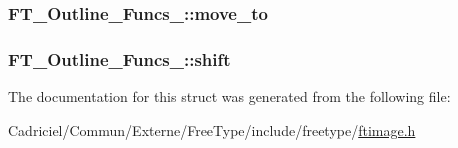 \hypertarget{struct_f_t___outline___funcs___abd53463a59a1ae2c6998e619c2ab6a65}{
\subsubsection[{move\-\_\-to}]{ F\-T\-\_\-\-Outline\-\_\-\-Funcs\-\_\-\-::move\-\_\-to}}\label{struct_f_t___outline___funcs___abd53463a59a1ae2c6998e619c2ab6a65}
\hypertarget{struct_f_t___outline___funcs___a540c246669b21b86cb405b3d9019cfda}{
\subsubsection[{shift}]{ F\-T\-\_\-\-Outline\-\_\-\-Funcs\-\_\-\-::shift}}\label{struct_f_t___outline___funcs___a540c246669b21b86cb405b3d9019cfda}


The documentation for this struct was generated from the following file\-:\begin{DoxyCompactItemize}
\item 
Cadriciel/\-Commun/\-Externe/\-Free\-Type/include/freetype/\hyperlink{ftimage_8h}{ftimage.\-h}\end{DoxyCompactItemize}

